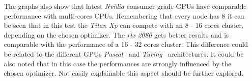 The graphs also show that latest \textit{Nvidia} consumer-grade GPUs have comparable
performance with multi-cores CPUs.
Remembering that every node has $8$ it can be seen that in this test the \textit{Titan Xp}
can compete with an $8$ - $16$ cores cluster, depending on the chosen optimizer.
The \textit{rtx 2080} gets better results and is comparable with the performance of a $16$ -
$32$ cores cluster. This difference could be related to the different GPUs
\textit{Pascal}~\cite{pascal} and \textit{Turing}~\cite{turing} architectures. It could
be also noted that in this case the performances are strongly influenced by the chosen
optimizer. Not easily explainable this aspect should be further explored.
